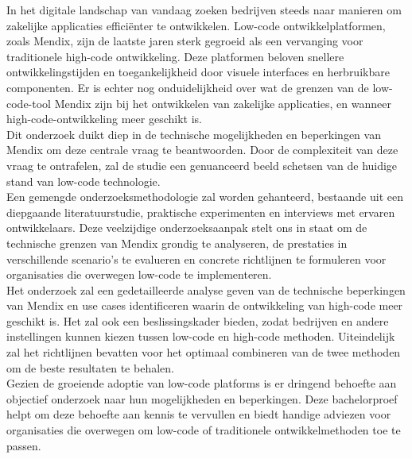 \documentclass[dutch,dit,thesis]{hogentreport}
\begin{document}
    In het digitale landschap van vandaag zoeken bedrijven steeds naar manieren om zakelijke applicaties efficiënter te ontwikkelen. Low-code ontwikkelplatformen, zoals Mendix, zijn de laatste jaren sterk gegroeid als een vervanging voor traditionele high-code ontwikkeling. Deze platformen beloven snellere ontwikkelingstijden en toegankelijkheid door visuele interfaces en herbruikbare componenten. Er is echter nog onduidelijkheid over wat de grenzen van de low-code-tool Mendix zijn bij het ontwikkelen van zakelijke applicaties, en wanneer high-code-ontwikkeling meer geschikt is.
    \\
    Dit onderzoek duikt diep in de technische mogelijkheden en beperkingen van Mendix om deze centrale vraag te beantwoorden. Door de complexiteit van deze vraag te ontrafelen, zal de studie een genuanceerd beeld schetsen van de huidige stand van low-code technologie.
    \\
    Een gemengde onderzoeksmethodologie zal worden gehanteerd, bestaande uit een diepgaande literatuurstudie, praktische experimenten en interviews met ervaren ontwikkelaars. Deze veelzijdige onderzoeksaanpak stelt ons in staat om de technische grenzen van Mendix grondig te analyseren, de prestaties in verschillende scenario's te evalueren en concrete richtlijnen te formuleren voor organisaties die overwegen low-code te implementeren.
    \\
    Het onderzoek zal een gedetailleerde analyse geven van de technische beperkingen van Mendix en use cases identificeren waarin de ontwikkeling van high-code meer geschikt is. Het zal ook een beslissingskader bieden, zodat bedrijven en andere instellingen kunnen kiezen tussen low-code en high-code methoden. Uiteindelijk zal het richtlijnen bevatten voor het optimaal combineren van de twee methoden om de beste resultaten te behalen.
    \\
    Gezien de groeiende adoptie van low-code platforms is er dringend behoefte aan objectief onderzoek naar hun mogelijkheden en beperkingen. Deze bachelorproef helpt om deze behoefte aan kennis te vervullen en biedt handige adviezen voor organisaties die overwegen om low-code of traditionele ontwikkelmethoden toe te passen.
    
    
    
    
    
    \backmatter{}
    
    \setlength\bibitemsep{2pt} %
    \printbibliography[heading=bibintoc]

    
\end{document}

